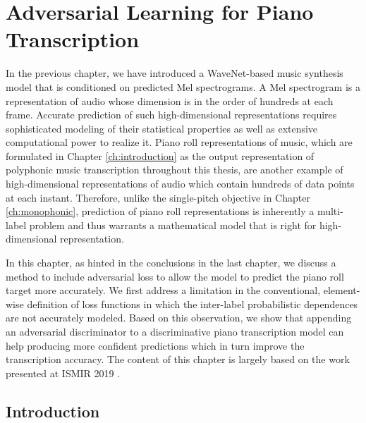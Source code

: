 
\graphicspath{{6-adversarial/figures/}}

\chapter{Adversarial Learning for Piano Transcription}
\label{ch:adversarial}

In the previous chapter, we have introduced a WaveNet-based music synthesis model that is conditioned on predicted Mel spectrograms.
A Mel spectrogram is a representation of audio whose dimension is in the order of hundreds at each frame.
Accurate prediction of such high-dimensional representations requires sophisticated modeling of their statistical properties as well as extensive computational power to realize it.
Piano roll representations of music, which are formulated in Chapter \ref{ch:introduction} as the output representation of polyphonic music transcription throughout this thesis, are another example of high-dimensional representations of audio which contain hundreds of data points at each instant.
Therefore, unlike the single-pitch objective in Chapter \ref{ch:monophonic}, prediction of piano roll representations is inherently a multi-label problem and thus warrants a mathematical model that is right for high-dimensional representation.

In this chapter, as hinted in the conclusions in the last chapter, we discuss a method to include adversarial loss to allow the model to predict the piano roll target more accurately.
We first address a limitation in the conventional, element-wise definition of loss functions in which the inter-label probabilistic dependences are not accurately modeled.
Based on this observation, we show that appending an adversarial discriminator to a discriminative piano transcription model can help producing more confident predictions which in turn improve the transcription accuracy.
The content of this chapter is largely based on the work presented at ISMIR 2019 \cite{kim2019adversarial}. 


\section{Introduction}

